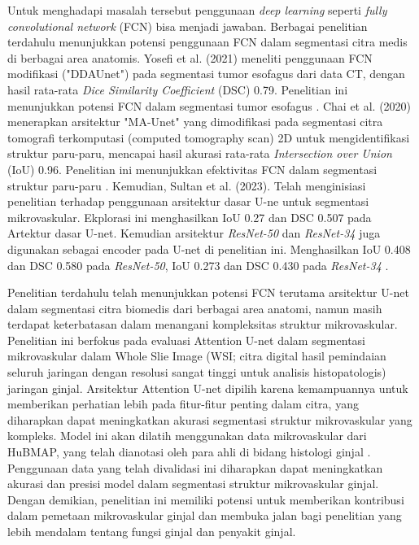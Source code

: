 \noindent Untuk menghadapi masalah tersebut penggunaan \textit{deep learning} seperti \textit{fully convolutional network }(FCN) bisa menjadi jawaban. Berbagai penelitian terdahulu menunjukkan potensi penggunaan FCN dalam segmentasi citra medis di berbagai area anatomis. Yosefi et al. (2021) meneliti penggunaan FCN modifikasi ("DDAUnet") pada segmentasi tumor esofagus dari data CT, dengan hasil rata-rata \textit{Dice Similarity Coefficient} (DSC) 0.79. Penelitian ini menunjukkan potensi FCN dalam segmentasi tumor esofagus \cite{yousefi_esophageal_2021}. Chai et al. (2020) menerapkan arsitektur "MA-Unet" yang dimodifikasi pada segmentasi citra tomografi terkomputasi (computed tomography scan) 2D untuk mengidentifikasi struktur paru-paru, mencapai hasil akurasi rata-rata \textit{Intersection over Union} (IoU) 0.96. Penelitian ini menunjukkan efektivitas FCN dalam segmentasi struktur paru-paru \cite{cai_ma-unet_2020}.
Kemudian, Sultan et al. (2023). Telah menginisiasi penelitian terhadap penggunaan arsitektur dasar U-ne untuk segmentasi mikrovaskular. Ekplorasi ini menghasilkan IoU 0.27 dan DSC 0.507 pada Artektur dasar U-net. Kemudian arsitektur \textit{ResNet-50} dan \textit{ResNet-34} juga digunakan sebagai encoder pada U-net di penelitian ini. Menghasilkan IoU 0.408 dan DSC 0.580 pada \textit{ResNet-50}, IoU 0.273 dan DSC 0.430 pada \textit{ResNet-34} \cite{sultan_microvasculature_2023}.


\noindent Penelitian terdahulu telah menunjukkan potensi FCN terutama arsitektur U-net dalam segmentasi citra biomedis dari berbagai area anatomi, namun masih terdapat keterbatasan dalam menangani kompleksitas struktur mikrovaskular. Penelitian ini berfokus pada evaluasi Attention U-net dalam segmentasi mikrovaskular dalam Whole Slie Image  (WSI; citra digital hasil pemindaian seluruh jaringan dengan resolusi sangat tinggi untuk analisis histopatologis) jaringan ginjal. Arsitektur Attention U-net dipilih karena kemampuannya untuk memberikan perhatian lebih pada fitur-fitur penting dalam citra, yang diharapkan dapat meningkatkan akurasi segmentasi struktur mikrovaskular yang kompleks. Model ini akan dilatih menggunakan data mikrovaskular dari HuBMAP, yang telah dianotasi oleh para ahli di bidang histologi ginjal \cite{howard_hubmap_2023}. Penggunaan data yang telah divalidasi ini diharapkan dapat meningkatkan akurasi dan presisi model dalam segmentasi struktur mikrovaskular ginjal. Dengan demikian, penelitian ini memiliki potensi untuk memberikan kontribusi dalam pemetaan mikrovaskular ginjal dan membuka jalan bagi penelitian yang lebih mendalam tentang fungsi ginjal dan penyakit ginjal. 

